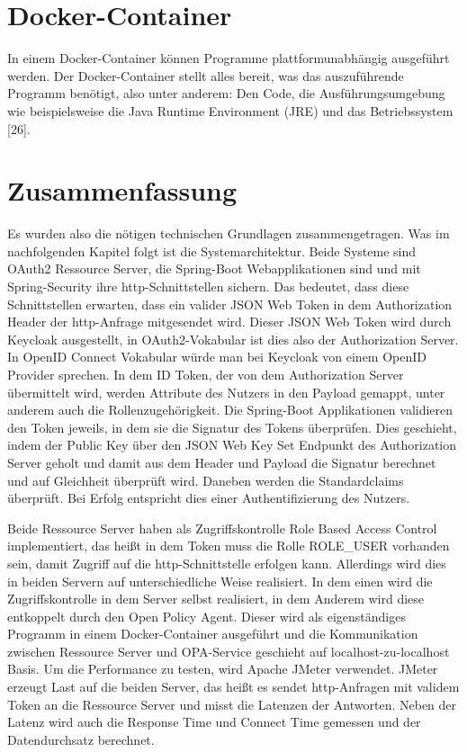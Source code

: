 \section{Docker-Container}
In einem Docker-Container können Programme plattformunabhängig ausgeführt werden. 
Der Docker-Container stellt alles bereit, was das auszuführende Programm benötigt, also 
unter anderem: Den Code, die Ausführungsumgebung wie beispielsweise die Java Runtime 
Environment (JRE) und das Betriebssystem [26]. 

\section{Zusammenfassung}
Es wurden also die nötigen technischen Grundlagen zusammengetragen. Was im nachfolgenden Kapitel folgt ist die Systemarchitektur.
Beide Systeme sind OAuth2 Ressource Server, die Spring-Boot Webapplikationen sind und mit Spring-Security ihre http-Schnittstellen sichern. Das bedeutet, dass diese Schnittstellen erwarten, dass ein valider JSON Web Token in dem Authorization Header der http-Anfrage mitgesendet wird. Dieser JSON Web Token wird durch Keycloak ausgestellt, in OAuth2-Vokabular ist dies also der Authorization Server. In OpenID Connect Vokabular würde man 
bei Keycloak von einem OpenID Provider sprechen. In dem ID Token, der von dem 
Authorization Server übermittelt wird, werden Attribute des Nutzers in den Payload 
gemappt, unter anderem auch die Rollenzugehörigkeit. Die Spring-Boot Applikationen 
validieren den Token jeweils, in dem sie die Signatur des Tokens überprüfen. Dies 
geschieht, indem der Public Key über den JSON Web Key Set Endpunkt des Authorization 
Server geholt und damit aus dem Header und Payload die Signatur berechnet und auf 
Gleichheit überprüft wird. Daneben werden die Standardclaims überprüft. Bei Erfolg 
entspricht dies einer Authentifizierung des Nutzers.\smallskip

Beide Ressource Server haben als Zugriffskontrolle Role Based Access Control 
implementiert, das heißt in dem Token muss die Rolle ROLE\_USER vorhanden sein, damit 
Zugriff auf die http-Schnittstelle erfolgen kann. Allerdings wird dies in beiden Servern auf 
unterschiedliche Weise realisiert. In dem einen wird die Zugriffskontrolle in dem Server 
selbst realisiert, in dem Anderem wird diese entkoppelt durch den Open Policy Agent. 
Dieser wird als eigenständiges Programm in einem Docker-Container ausgeführt und die 
Kommunikation zwischen Ressource Server und OPA-Service geschieht auf localhost-zu-localhost Basis. 
Um die Performance zu testen, wird Apache JMeter verwendet. JMeter erzeugt Last auf die 
beiden Server, das heißt es sendet http-Anfragen mit validem Token an die Ressource 
Server und misst die Latenzen der Antworten. Neben der Latenz wird auch die Response 
Time und Connect Time gemessen und der Datendurchsatz berechnet.